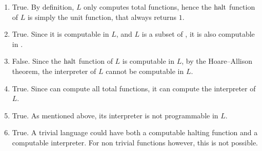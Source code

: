 \begin{solution}
\begin{enumerate}
	\item True.
	By definition, \(L\) only computes total functions,
	hence the \(\mathrm{halt}\) function of \(L\) is simply the unit function,
	that always returns \(1\).
	\item True.
	Since it is computable in \(L\), and \(L\) is a subset of \java,
	it is also computable in \java.
	\item False.
	Since the \(\mathrm{halt}\) function of \(L\) is computable in \(L\),
	by the Hoare--Allison theorem, the interpreter of \(L\)
	cannot be computable in \(L\).
	\item True.
	Since \java{} can compute all total functions,
	it can compute the interpreter of \(L\).
	\item True.
	As mentioned above, its interpreter is not programmable in \(L\).
	\item True.
	A trivial language could have both a computable halting function
	and a computable interpreter.
	For non trivial functions however, this is not possible.
\end{enumerate}
\end{solution}
